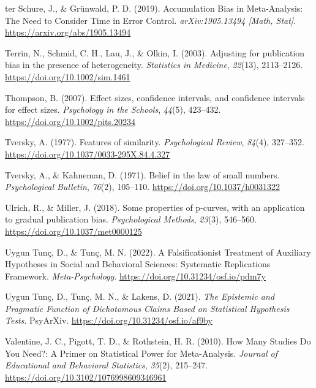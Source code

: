 \documentclass[
  oneside]{krantz}
\newlength{\cslhangindent}
\newlength{\cslentryspacingunit} %
\newenvironment{CSLReferences}[2] %
 {%
  \setlength{\parindent}{0pt}
  \ifodd #1
  \let\oldpar\par
  \def\par{\hangindent=\cslhangindent\oldpar}
  \fi
  \setlength{\parskip}{#2\cslentryspacingunit}
 }%
 {}
\begin{document}
\begin{CSLReferences}{1}{0}
\leavevmode{}%
ter Schure, J., \& Grünwald, P. D. (2019). Accumulation {Bias} in
{Meta-Analysis}: {The Need} to {Consider Time} in {Error Control}.
\emph{arXiv:1905.13494 {[}Math, Stat{]}}.
\url{https://arxiv.org/abs/1905.13494}

\leavevmode{}%
Terrin, N., Schmid, C. H., Lau, J., \& Olkin, I. (2003). Adjusting for
publication bias in the presence of heterogeneity. \emph{Statistics in
Medicine}, \emph{22}(13), 2113--2126.
\url{https://doi.org/10.1002/sim.1461}

\leavevmode{}%
Thompson, B. (2007). Effect sizes, confidence intervals, and confidence
intervals for effect sizes. \emph{Psychology in the Schools},
\emph{44}(5), 423--432. \url{https://doi.org/10.1002/pits.20234}

\leavevmode{}%
Tversky, A. (1977). Features of similarity. \emph{Psychological Review},
\emph{84}(4), 327--352. \url{https://doi.org/10.1037/0033-295X.84.4.327}

\leavevmode{}%
Tversky, A., \& Kahneman, D. (1971). Belief in the law of small numbers.
\emph{Psychological Bulletin}, \emph{76}(2), 105--110.
\url{https://doi.org/10.1037/h0031322}

\leavevmode{}%
Ulrich, R., \& Miller, J. (2018). Some properties of p-curves, with an
application to gradual publication bias. \emph{Psychological Methods},
\emph{23}(3), 546--560. \url{https://doi.org/10.1037/met0000125}

\leavevmode{}%
Uygun Tunç, D., \& Tunç, M. N. (2022). A {Falsificationist Treatment} of
{Auxiliary Hypotheses} in {Social} and {Behavioral Sciences}:
{Systematic Replications Framework}. \emph{Meta-Psychology}.
\url{https://doi.org/10.31234/osf.io/pdm7y}

\leavevmode{}%
Uygun Tunç, D., Tunç, M. N., \& Lakens, D. (2021). \emph{The {Epistemic}
and {Pragmatic Function} of {Dichotomous Claims Based} on {Statistical
Hypothesis Tests}}. {PsyArXiv}.
\url{https://doi.org/10.31234/osf.io/af9by}

\leavevmode{}%
Valentine, J. C., Pigott, T. D., \& Rothstein, H. R. (2010). How {Many
Studies Do You Need}?: {A Primer} on {Statistical Power} for
{Meta-Analysis}. \emph{Journal of Educational and Behavioral
Statistics}, \emph{35}(2), 215--247.
\url{https://doi.org/10.3102/1076998609346961}


\end{CSLReferences}
\end{document}
